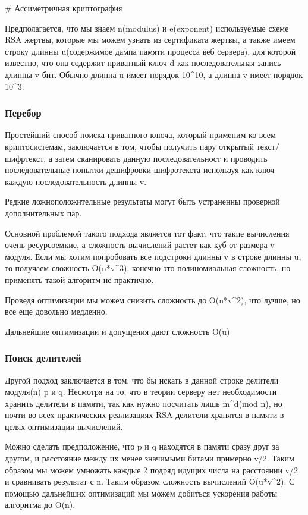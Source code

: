 \documentclass[20pt]{article}
\begin{document}
# Ассиметричная криптография

Предполагается, что мы знаем n(modulus) и e(exponent) используемые схеме RSA жертвы, которые мы можем узнать из сертификата жертвы, а также
имеем строку длинны u(содержимое дампа памяти процесса веб сервера), для которой известно, что она содержит приватный ключ d как последовательная запись длинны v бит. Обычно длинна u имеет порядок 10^10, а длинна v имеет порядок 10^3.

\subsubsection{Перебор}

Простейший способ поиска приватного ключа, который применим ко всем криптосистемам, заключается в том, чтобы получить пару открытый текст/шифртекст, а затем сканировать данную последовательност и проводить последовательные попытки дешифровки шифротекста используя как ключ каждую последовательность длинны v.

Редкие ложноположительные результаты могут быть устраненны проверкой дополнительных пар.

Основной проблемой такого подхода является тот факт, что такие вычисления очень ресурсоемкие, а сложность вычислений растет как куб от размера v модуля. Если мы хотим попробовать все подстроки длинны v в строке длинны u, то получаем сложность O(n*v^3), конечно это полиномиальная сложность, но применять такой алгоритм не практично.

Проведя оптимизации мы можем снизить сложность до O(n*v^2), что лучше, но все еще довольно медленно.

Дальнейшие оптимизации и допущения дают сложность O(u)

\subsubsection{Поиск делителей}

Другой подход заключается в том, что бы искать в данной строке делители модуля(n) p и q. Несмотря на то, что в теории серверу нет необходимости хранить делители в памяти, так как нужно посчитать лишь m^d(mod n), но почти во всех практических реализациях RSA делители хранятся в памяти в целях оптимизации вычислений.

Можно сделать предположение, что p и q находятся в памяти сразу друг за другом, и расстояние между их менее значимыми битами примерно v/2. Таким образом мы можем умножать каждые 2 подряд идущих числа на расстоянии v/2 и сравнивать результат с n. Таким образом сложность вычислений O(u*v^2). С помощью дальнейших оптимизаций мы можем добиться ускорения работы алгоритма до O(n).
\end{document}
